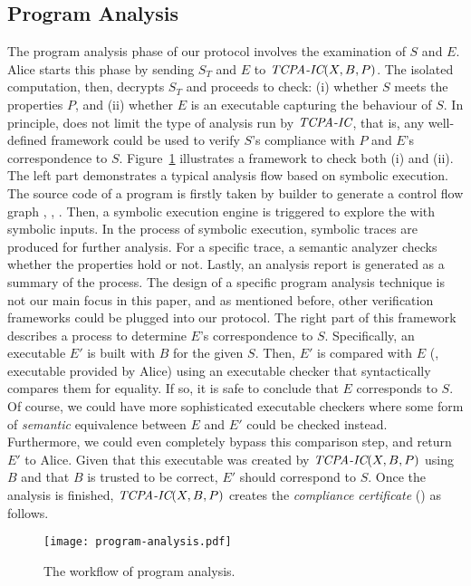 \subsection{Program Analysis}
\label{subsec:ssg}

The program analysis phase of our protocol involves the examination of $S$ and $E$. 
Alice starts this phase by sending $S_T$ and $E$ to $\textit{TCPA-IC}{}(X,B,P)$. 
The isolated computation, then, decrypts $S_T$ and proceeds to check: (i) whether $S$ meets the properties $P$, and (ii) whether $E$ is an executable capturing the behaviour of $S$. In principle, \tcpa does not limit the type of analysis 
run by $\textit{TCPA-IC}{}$, that is, any well-defined framework could be used to verify $S$'s compliance with $P$ and $E$'s correspondence to $S$. Figure~\ref{fig:program-analysis} illustrates a framework to check both (i) and (ii).
The left part demonstrates a typical analysis flow based on symbolic execution. The source code 
of a program is firstly taken by \cfg builder to generate a control flow graph , \ie, \cfg. 
Then, a symbolic execution engine is triggered to explore the \cfg with symbolic inputs. 
In the process of symbolic execution, symbolic traces are produced for further analysis. 
For a specific trace, a semantic analyzer checks whether the properties hold or not. Lastly, 
an analysis report is generated as a summary of the process. The design 
of a specific program analysis technique is not our main focus in this paper, and as mentioned before, other verification frameworks could be plugged into our \tcpa protocol. The right part of this framework describes a process to determine $E$'s correspondence 
to $S$. Specifically, an executable $E'$ is built with $B$ for the given $S$. 
Then, $E'$ is compared with $E$ (\ie, executable provided by Alice) using an executable checker that syntactically compares them for equality. If so, it is safe to conclude that $E$ corresponds to $S$. Of course, we could have more sophisticated executable checkers where some form of \emph{semantic} equivalence between $E$ and $E'$ could be checked instead. Furthermore, we could even completely bypass this comparison step, and return $E'$ to Alice. Given that this executable was created by $\textit{TCPA-IC}{}(X,B,P)$ using $B$ and that $B$ is trusted to be correct, $E'$ should correspond to $S$. Once the analysis is finished, $\textit{TCPA-IC}{}(X,B,P)$ creates the \emph{compliance certificate} (\CC{}) as follows.

\begin{figure}[t]
	\centering
	\texttt{[image: program-analysis.pdf]}
	\caption{\label{fig:program-analysis}The workflow of program analysis.}	
\end{figure}

